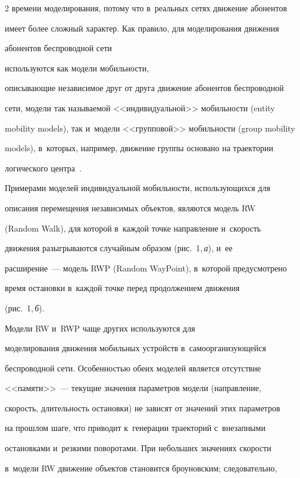 \begin{multicols}{2}
времени моделирования, потому что в~реальных сетях движение абонентов 

имеет более слож\-ный характер. Как правило, для моделирования движения 

абонентов беспроводной сети\linebreak

 используются как модели мо\-биль\-ности, 

опи\-сы\-ва\-ющие независимое друг от друга движение абонен\-тов беспроводной 

сети, модели так на\-зы\-ва\-емой <<индивидуальной>> мо\-биль\-ности (entity 

mobility models), так и~модели <<групповой>> мо\-биль\-ности (group mobility 

models), в~которых, например, движение группы основано на траектории 

логического цент\-ра~\cite{9-sg, 10-sg, 11-sg}.

  

  Примерами моделей индивидуальной мобильности, использующихся для 

описания перемещения независимых объектов, являются модель RW 

(Random Walk), для которой в~каж\-дой точке на\-прав\-ле\-ние и~ско\-рость 

движения разыгрываются случайным образом (рис.~1,\,\textit{а}), и~ее 

расширение~--- модель RWP (Random WayPoint), в~которой пред\-усмот\-ре\-но 

время остановки в~каж\-дой точке перед продолжением движения 

(рис.~1,\,\textit{б}). 



Модели RW и~RWP чаще других используются для 

моделирования движения мобильных устройств в~самоорганизующейся 

беспроводной сети. Особенностью обеих моделей является отсутствие 

<<памяти>>~--- текущие значения па\-ра\-мет\-ров модели (на\-прав\-ле\-ние, 

ско\-рость, длительность остановки) не зависят от значений этих па\-ра\-мет\-ров 

на прошлом шаге, что приводит к~генерации траекторий с~внезапными 

остановками и~резкими поворотами. При небольших значениях ско\-рости 

в~модели RW движение объектов становится броуновским; следовательно, 


\end{multicols}

